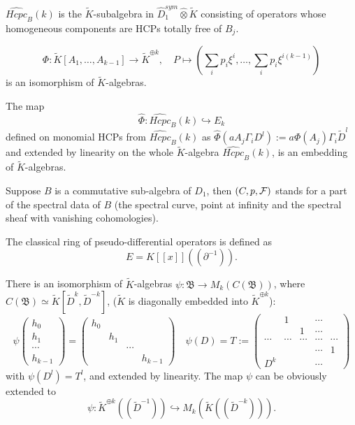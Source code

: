 \documentclass[11pt]{article}
\theoremstyle{definition}
\theoremstyle{plain}
\numberwithin{equation}{section}
\newcommand{\cf}{{{\cal F}}}
\begin{document}
	$\widehat{Hcpc}_B(k)$ is the $\tilde{K}$-subalgebra in $\hat{D}_1^{sym}\hat{\otimes}\tilde{K}$ consisting of operators whose homogeneous components are HCPs totally free of $B_j$. 
	
	$$\Phi : \tilde{K}[A_1,\ldots ,A_{k-1}]\rightarrow \tilde{K}^{\oplus k} , \quad P\mapsto (\sum_i p_i\xi^{i}, \ldots , \sum_i p_i\xi^{i(k-1)})
$$
is an isomorphism of $\tilde{K}$-algebras. 	

The map 
$$
\hat{\Phi}: \widehat{Hcpc}_B(k) \hookrightarrow E_k
$$
defined on monomial HCPs from $\widehat{Hcpc}_B(k)$ as $\hat{\Phi} (a A_j\Gamma_iD^l):=a \Phi (A_j)\Gamma_i\tilde{D}^l$ and extended by linearity on the whole $\tilde{K}$-algebra $\widehat{Hcpc}_B(k)$, is an embedding of $\tilde{K}$-algebras.
	
	Suppose $B$ is a commutative sub-algebra of $D_1$, then $(C,p,\cf)$ stands for a part of the spectral data of $B$ (the spectral curve, point at infinity and the spectral sheaf with vanishing cohomologies).
	
	The classical ring of pseudo-differential operators is defined as 
	$$
E=K[[x]]((\partial^{-1})).
	$$
	
There is an isomorphism of $\tilde{K}$-algebras $\psi:\mathfrak{B}\rightarrow M_k(C(\mathfrak{B}))$, where $C(\mathfrak{B})\simeq \tilde{K}[\tilde{D}^k, \tilde{D}^{-k}]$, ($\tilde{K}$ is diagonally embedded into $\tilde{K}^{\oplus k}$):
	$$
	\psi\begin{pmatrix}
		h_0 \\
		h_1 \\
		\cdots \\
		h_{k-1}
	\end{pmatrix}=\begin{pmatrix}
		h_0 &  &  &  \\
		& h_1 &  &  \\
		&  & \cdots &  \\
		&  &  & h_{k-1}
	\end{pmatrix}\quad \psi(D)=T:=\begin{pmatrix}
		& 1 &  & \cdots &  \\
		&  & 1 & \cdots &  \\
		\cdots & \cdots & \cdots & \cdots & \cdots \\
		&  &  & \cdots & 1 \\
		D^k &  &  & \cdots & 
	\end{pmatrix}
	$$
	with $\psi(D^l)=T^l$, and extended by linearity. The map $\psi$ can be obviously extended to 
	$$
\psi : \tilde{K}^{\oplus k}((\tilde{D}^{-1})) \hookrightarrow M_k(\tilde{K}((\tilde{D}^{-k}))).
	$$
\end{document}
